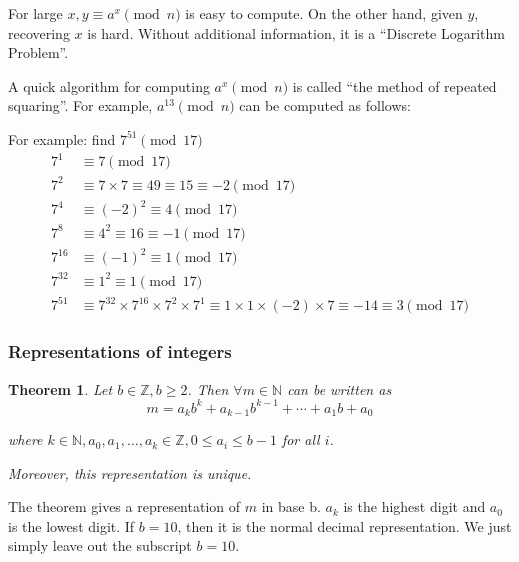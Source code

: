 \documentclass[letterpaper,12pt,oneside]{article}
\newtheorem{theorem}{Theorem}
\begin{document}
For large $x,y\equiv a^x \pmod n$ is easy to compute. On the other hand, given
$y$, recovering $x$ is hard. Without additional information, it is a ``Discrete
Logarithm Problem''.

A quick algorithm for computing $a^x \pmod n$ is called ``the method of
repeated squaring''. For example, $a^{13} \pmod n$ can be computed as follows:

For example: find $7^51\pmod 17$
\begin{align*}
    7^1    & \equiv 7 \pmod {17}                                                                                               \\
    7^2    & \equiv 7\times 7 \equiv 49 \equiv 15 \equiv -2 \pmod {17}                                                         \\
    7^4    & \equiv (-2)^2 \equiv 4 \pmod {17}                                                                                 \\
    7^8    & \equiv 4^2 \equiv 16 \equiv -1 \pmod {17}                                                                         \\
    7^{16} & \equiv (-1)^2 \equiv 1 \pmod {17}                                                                                 \\
    7^{32} & \equiv 1^2 \equiv 1 \pmod {17}                                                                                    \\
    7^{51} & \equiv 7^{32}\times 7^{16}\times 7^2\times 7^1 \equiv 1\times 1\times (-2)\times 7 \equiv -14 \equiv 3 \pmod {17}
\end{align*}

\subsubsection{Representations of integers}
\begin{theorem}
    Let $b\in \mathbb{Z},b\ge 2$. Then $\forall m \in \mathbb{N}$ can be written as \[
        m=a_k b^k+a_{k-1}b^{k-1}+\cdots+a_1b+a_0
    \]

    where $k\in \mathbb{N},a_0,a_1,\ldots,a_k\in \mathbb{Z},0\le a_i\le b-1$ for
    all $i$.

    Moreover, this representation is unique.
\end{theorem}
The theorem gives a representation of $m$ in base b. $a_k$ is the highest digit and $a_0$ is the lowest digit. If $b=10$, then it is the normal decimal representation. We just simply leave out the subscript $b=10$.
\end{document}
